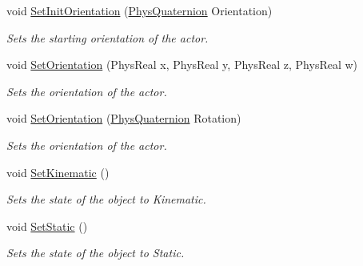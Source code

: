 \begin{DoxyCompactItemize}
void \hyperlink{classActorBase_a72e2d0064c3e4c4d8937f490397a333f}{SetInitOrientation} (\hyperlink{classPhysQuaternion}{PhysQuaternion} Orientation)
\begin{DoxyCompactList}\small\item\em Sets the starting orientation of the actor. \item\end{DoxyCompactList}\item 
void \hyperlink{classActorBase_a9777506815a9840552b30c65d5d70f8d}{SetOrientation} (PhysReal x, PhysReal y, PhysReal z, PhysReal w)
\begin{DoxyCompactList}\small\item\em Sets the orientation of the actor. \item\end{DoxyCompactList}\item 
void \hyperlink{classActorBase_a5fe558ca0a88061615cda52a4dc5bf66}{SetOrientation} (\hyperlink{classPhysQuaternion}{PhysQuaternion} Rotation)
\begin{DoxyCompactList}\small\item\em Sets the orientation of the actor. \item\end{DoxyCompactList}\item 
void \hyperlink{classActorBase_a2d5f990e8c6925b7e44e9ec85f379e6a}{SetKinematic} ()
\begin{DoxyCompactList}\small\item\em Sets the state of the object to Kinematic. \item\end{DoxyCompactList}\item 
void \hyperlink{classActorBase_a97f55e5fff5d69483ebb0b9042a50bb0}{SetStatic} ()
\begin{DoxyCompactList}\small\item\em Sets the state of the object to Static. \item\end{DoxyCompactList}\end{DoxyCompactItemize}
